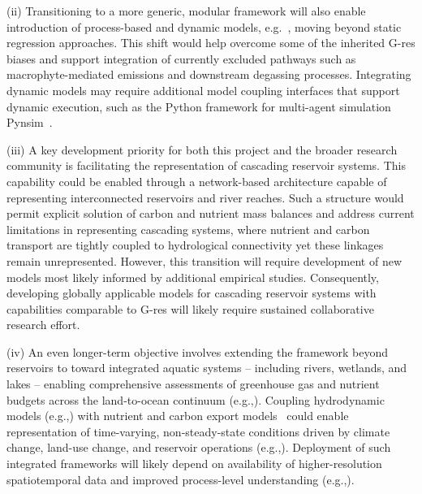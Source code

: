 \documentclass[review, authoryear, 1p]{elsarticle} %
\begin{document}
(ii) Transitioning to a more generic, modular framework will also enable introduction of process-based and dynamic models, e.g.~\cite{Soued2020exp, Delwiche2022}, moving beyond static regression approaches. 
This shift would help overcome some of the inherited G-res biases and support integration of currently excluded pathways such as macrophyte-mediated emissions and downstream degassing processes.
Integrating dynamic models may require additional model coupling interfaces that support dynamic execution, such as the Python framework for multi-agent simulation Pynsim~\citep{Knox2018_Pynsim}.

(iii) A key development priority for both this project and the broader research community is facilitating the representation of cascading reservoir systems. 
This capability could be enabled through a network-based architecture capable of representing interconnected reservoirs and river reaches.
Such a structure would permit explicit solution of carbon and nutrient mass balances and address current limitations in representing cascading systems, where nutrient and carbon transport are tightly coupled to hydrological connectivity yet these linkages remain unrepresented.
However, this transition will require development of new models most likely informed by additional empirical studies.
Consequently, developing globally applicable models for cascading reservoir systems with capabilities comparable to G-res will likely require sustained collaborative research effort.

(iv) An even longer-term objective involves extending the framework beyond reservoirs to toward integrated aquatic systems -- including rivers, wetlands, and lakes -- enabling comprehensive assessments of greenhouse gas and nutrient budgets across the land-to-ocean continuum (e.g.,\cite{Nixon2003,Maranger2018,Maavara2020}).
Coupling hydrodynamic models (e.g.,\cite{Almeida2022_temperatures,Long2019_Jinsha,He2025a}) with nutrient and carbon export models~\cite{He2025b} could enable representation of time-varying, non-steady-state conditions driven by climate change, land-use change, and reservoir operations (e.g.,\cite{Harrison2017}).
Deployment of such integrated frameworks will likely depend on availability of higher-resolution spatiotemporal data and improved process-level understanding (e.g.,\cite{grasset2021empirical}).
\end{document}
